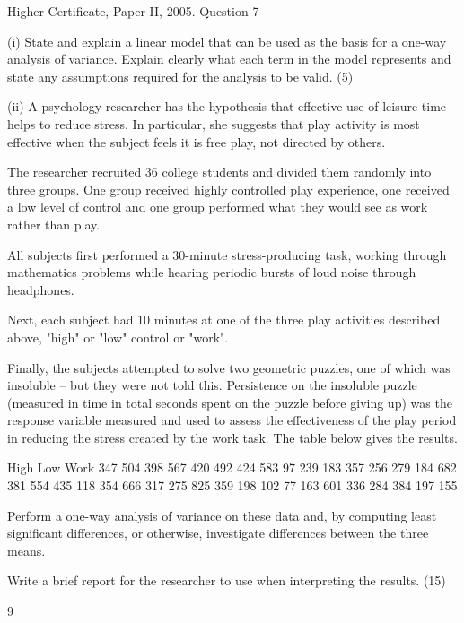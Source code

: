 \documentclass[a4paper,12pt]{article}
\begin{document}
Higher Certificate, Paper II, 2005. Question 7
\begin{framed}
 (i) State and explain a linear model that can be used as the basis for a one-way analysis of variance.  Explain clearly what each term in the model represents and state any assumptions required for the analysis to be valid. (5) 
 
 (ii) A psychology researcher has the hypothesis that effective use of leisure time helps to reduce stress.  In particular, she suggests that play activity is most effective when the subject feels it is free play, not directed by others. 
 
The researcher recruited 36 college students and divided them randomly into three groups.  One group received highly controlled play experience, one received a low level of control and one group performed what they would see as work rather than play. 
 
All subjects first performed a 30-minute stress-producing task, working through mathematics problems while hearing periodic bursts of loud noise through headphones. 
 
Next, each subject had 10 minutes at one of the three play activities described above, "high" or "low" control or "work". 
 
Finally, the subjects attempted to solve two geometric puzzles, one of which was insoluble – but they were not told this.  Persistence on the insoluble puzzle (measured in time in total seconds spent on the puzzle before giving up) was the response variable measured and used to assess the effectiveness of the play period in reducing the stress created by the work task.  The table below gives the results. 
 
High Low Work 347 504 398 567 420 492 424 583   97 239 183 357 256 279 184 682 381 554 435 118 354 666 317 275 825 359 198 102   77 163 601 336 284 384 197 155 
 
 
Perform a one-way analysis of variance on these data and, by computing least significant differences, or otherwise, investigate differences between the three means. 
 
Write a brief report for the researcher to use when interpreting the results. 
(15) 
 

 
9 
\end{framed}
\end{document}
